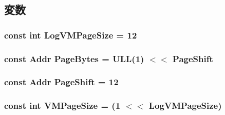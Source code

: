 \subsection{変数}
\hypertarget{namespaceNullISA_a554fef169d109a5ccb7ce0dd6a43e521}{
\subsubsection[{LogVMPageSize}]{\setlength{\rightskip}{0pt plus 5cm}const int {\bf LogVMPageSize} = 12}}
\label{namespaceNullISA_a554fef169d109a5ccb7ce0dd6a43e521}
\hypertarget{namespaceNullISA_ad9d6a4d965e107c9a7214f096107296b}{
\subsubsection[{PageBytes}]{\setlength{\rightskip}{0pt plus 5cm}const {\bf Addr} {\bf PageBytes} = ULL(1) $<$$<$ {\bf PageShift}}}
\label{namespaceNullISA_ad9d6a4d965e107c9a7214f096107296b}
\hypertarget{namespaceNullISA_a6eacddc1d6d191380d9afdac5920ea48}{
\subsubsection[{PageShift}]{\setlength{\rightskip}{0pt plus 5cm}const {\bf Addr} {\bf PageShift} = 12}}
\label{namespaceNullISA_a6eacddc1d6d191380d9afdac5920ea48}
\hypertarget{namespaceNullISA_a891eaf95159d764e6efae501c2860a3a}{
\subsubsection[{VMPageSize}]{\setlength{\rightskip}{0pt plus 5cm}const int {\bf VMPageSize} = (1 $<$$<$ {\bf LogVMPageSize})}}
\label{namespaceNullISA_a891eaf95159d764e6efae501c2860a3a}
